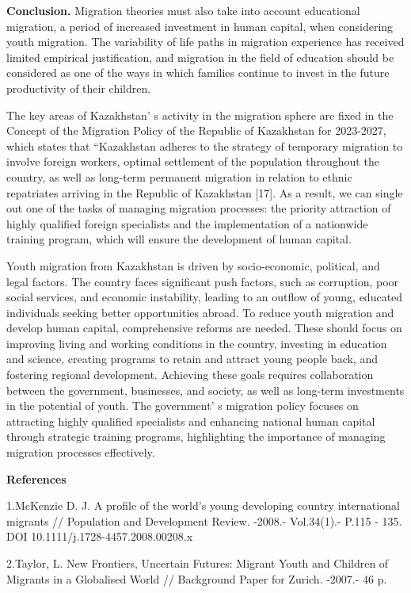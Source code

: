 {{\bfseries Conclusion.} Migration theories must also take into account
educational migration, a period of increased investment in human
capital, when considering youth migration. The variability of life paths
in migration experience has received limited empirical justification,
and migration in the field of education should be considered as one of
the ways in which families continue to invest in the future productivity
of their children.

The key areas of Kazakhstan' s activity in the migration
sphere are fixed in the Concept of the Migration Policy of the Republic
of Kazakhstan for 2023-2027, which states that ``Kazakhstan adheres to
the strategy of temporary migration to involve foreign workers, optimal
settlement of the population throughout the country, as well as
long-term permanent migration in relation to ethnic repatriates arriving
in the Republic of Kazakhstan {[}17{]}. As a result, we can single out
one of the tasks of managing migration processes: the priority
attraction of highly qualified foreign specialists and the
implementation of a nationwide training program, which will ensure the
development of human capital.

Youth migration from Kazakhstan is driven by socio-economic, political,
and legal factors. The country faces significant push factors, such as
corruption, poor social services, and economic instability, leading to
an outflow of young, educated individuals seeking better opportunities
abroad. To reduce youth migration and develop human capital,
comprehensive reforms are needed. These should focus on improving living
and working conditions in the country, investing in education and
science, creating programs to retain and attract young people back, and
fostering regional development. Achieving these goals requires
collaboration between the government, businesses, and society, as well
as long-term investments in the potential of youth. The
government' s migration policy focuses on attracting
highly qualified specialists and enhancing national human capital
through strategic training programs, highlighting the importance of
managing migration processes effectively.

{\bfseries References}

1.McKenzie D. J. A profile of the world's young developing country
international migrants // Population and Development Review. -2008.-
Vol.34(1).- P.115 - 135. DOI 10.1111/j.1728-4457.2008.00208.x

2.Taylor, L. New Frontiers, Uncertain Futures: Migrant Youth and
Children of Migrants in a Globalised World // Background Paper for
Zurich. -2007.- 46 p.

}
